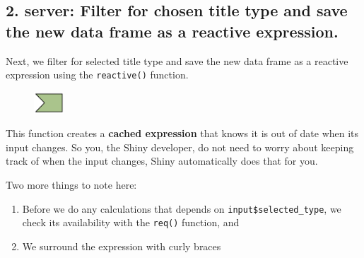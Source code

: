\documentclass[
  letterpaper,
  DIV=11,
  numbers=noendperiod]{scrreprt}
\newenvironment{Shaded}{\begin{snugshade}}{\end{snugshade}}
\newcommand{\CommentTok}[1]{\textcolor[rgb]{0.37,0.37,0.37}{#1}}
\newcommand{\FunctionTok}[1]{\textcolor[rgb]{0.28,0.35,0.67}{#1}}
\newcommand{\NormalTok}[1]{\textcolor[rgb]{0.00,0.46,0.62}{#1}}
\newcommand{\OtherTok}[1]{\textcolor[rgb]{0.00,0.46,0.62}{#1}}
\newcommand{\SpecialCharTok}[1]{\textcolor[rgb]{0.37,0.37,0.37}{#1}}
\providecommand{\tightlist}{%
  \setlength{\itemsep}{0pt}\setlength{\parskip}{0pt}}
\begin{document}
\hypertarget{server-filter-for-chosen-title-type-and-save-the-new-data-frame-as-a-reactive-expression.}{%
\subsection{\texorpdfstring{2. \textbf{server:} Filter for chosen title
type and save the new data frame as a reactive
expression.}{2. server: Filter for chosen title type and save the new data frame as a reactive expression.}}\label{server-filter-for-chosen-title-type-and-save-the-new-data-frame-as-a-reactive-expression.}}

Next, we filter for selected title type and save the new data frame as a
reactive expression using the \texttt{reactive()} function.

\begin{figure}

\includegraphics[width=0.1\textwidth,height=\textheight]{./images/expression.png} \hfill{}

\end{figure}

\begin{Shaded}
\end{Shaded}

This function creates a \textbf{cached expression} that knows it is out
of date when its input changes. So you, the Shiny developer, do not need
to worry about keeping track of when the input changes, Shiny
automatically does that for you.

Two more things to note here:

\begin{enumerate}
\def\labelenumi{\arabic{enumi}.}
\tightlist
\item
  Before we do any calculations that depends on
  \texttt{input\$selected\_type}, we check its availability with the
  \texttt{req()} function, and
\item
  We surround the expression with curly braces
\end{enumerate}
\end{document}
